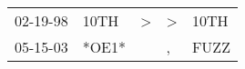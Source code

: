 \begin{supertabular}{lllll}
 02-19-98 &   10TH &  \textgreater &  \textgreater &  10TH \\
 05-15-03 &  *OE1* &               &             , &  FUZZ \\
\end{supertabular}
